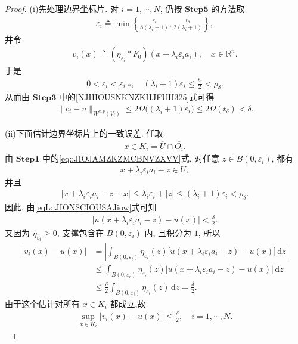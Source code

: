 \documentclass[../../main.tex]{subfiles}
\begin{document}
\begin{proof}
(i)先处理边界坐标片. 对 $i=1,\cdots,N$, 仍按 $\mathbf{Step}\mathbf{5}$ 的方法取
\begin{align*}
\varepsilon_i
\triangleq
\min\left\{
\frac{r_i}{8(\lambda_i+1)},
\frac{t_\delta}{2(\lambda_i+1)}
\right\},
\end{align*}
并令
\begin{align*}
v_i(x)
\triangleq
(\eta_{\varepsilon_i}*F_0)
(x+\lambda_i\varepsilon_i a_i),
\quad x\in\mathbb{R}^{n}.
\end{align*}
于是
\begin{align*}
0<\varepsilon_i<\varepsilon_{i,*},\quad
(\lambda_i+1)\varepsilon_i
\leqslant\frac{t_\delta}{2}
<\rho_\delta.
\end{align*}
从而由 $\mathbf{Step}\mathbf{3}$ 中的\eqref{NJHIOUSNKNZKHJFUH325}式可得
\begin{align*}
\|v_i-u\|_{W^{k,p}(V_i)}
\leqslant
2\Omega\bigl((\lambda_i+1)\varepsilon_i\bigr)
\leqslant2\Omega(t_\delta)
<\delta.
\end{align*}

(ii)下面估计边界坐标片上的一致误差. 任取
\begin{align*}
x\in K_i=\overline{U}\cap\overline{O_i}.
\end{align*}
由 $\mathbf{Step}\mathbf{1}$ 中的\eqref{eq::JIOJAMZKZMCBNVZXVV}式, 对任意 $z\in B(0,\varepsilon_i)$, 都有
\begin{align*}
x+\lambda_i\varepsilon_i a_i-z\in U,
\end{align*}
并且
\begin{align*}
|x+\lambda_i\varepsilon_i a_i-z-x|
\leqslant\lambda_i\varepsilon_i+|z|
\leqslant(\lambda_i+1)\varepsilon_i
<\rho_\delta.
\end{align*}
因此, 由\eqref{eqL::JIONSCIOUSAJiow}式可知
\begin{align*}
|u(x+\lambda_i\varepsilon_i a_i-z)-u(x)|
<\frac{\delta}{2}.
\end{align*}
又因为 $\eta_{\varepsilon_i}\geqslant0$, 支撑包含在 $B(0,\varepsilon_i)$ 内, 且积分为 $1$, 所以
\begin{align*}
|v_i(x)-u(x)|
&=
\left|
\int_{B(0,\varepsilon_i)}
\eta_{\varepsilon_i}(z)
\bigl[u(x+\lambda_i\varepsilon_i a_i-z)-u(x)\bigr]
\,\mathrm{d}z
\right|\\
&\leqslant
\int_{B(0,\varepsilon_i)}
\eta_{\varepsilon_i}(z)
|u(x+\lambda_i\varepsilon_i a_i-z)-u(x)|
\,\mathrm{d}z\\
&\leqslant
\frac{\delta}{2}
\int_{B(0,\varepsilon_i)}
\eta_{\varepsilon_i}(z)\,\mathrm{d}z
=\frac{\delta}{2}.
\end{align*}
由于这个估计对所有 $x\in K_i$ 都成立,故
\begin{align}\label{1242335346345363451}
\sup\limits_{x\in K_i}|v_i(x)-u(x)|
\leqslant\frac{\delta}{2},
\quad i=1,\cdots,N.
\end{align}


\end{proof}
\end{document}
